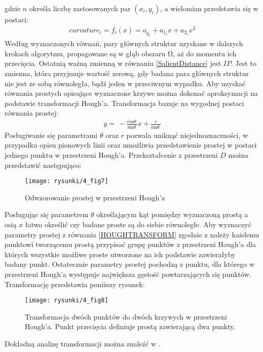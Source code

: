 \documentclass[12pt, twoside, openany]{report}
\theoremstyle{definition}
\begin{document}
gdzie $n$ określa liczbę zastosowanych par $(x_i,y_i)$, a wielomian przedstawia się w postaci:
\begin{align}
curvature_i={f_i\left(x\right)=a}_{0_i}+a_{1_i}x+a_{2_i}x^2
\end{align}
Według wyznaczonych równań, pary głównych struktur uzyskane w dalszych krokach algorytmu, propagowane są w głąb obszaru $\mathrm{\Omega }$, aż do momentu ich przecięcia. Ostatnią ważną zmienną w równaniu \eqref{SalientDistance} jest $IP$. Jest to zmienna, która przyjmuje wartość zerową, gdy badana para głównych struktur nie jest ze sobą równoległa, bądź jeden w przeciwnym wypadku. Aby uzyskać równania prostych opisujące wyznaczone krzywe można dokonać aproksymacji na podstawie transformacji Hough'a. Transformacja bazuje na wygodnej postaci równania prostej:
\begin{align}
y=\ -\frac{{\mathrm{cos} \theta \ }}{{\mathrm{sin} \theta \ }}x+\frac{r}{{\mathrm{sin} \theta \ }}
\label{HOUGHTRANSFORM}
\end{align}
Posługiwanie się parametrami $\theta $ oraz $r$ pozwala uniknąć niejednoznaczności, w przypadku opisu pionowych linii oraz umożliwia przedstawienie prostej w postaci jednego punktu w przestrzeni Hough'a. Przekształcenie z przestrzeni $D$ można przedstawić następująco:
\begin{figure}[!h]
	\centering
	\texttt{[image: rysunki/4\_fig7]}
	\caption{Odwzorowanie prostej w przestrzeni Hough’a}
\label{4_fig7}
\end{figure}
Posługując się parametrem $\theta$ określającym kąt pomiędzy wyznaczoną prostą a osią $x$ łatwo określić czy badane proste są do siebie równoległe. Aby wyznaczyć parametry prostej z równania \eqref{HOUGHTRANSFORM} zgodnie z \cite{houghTransform} należy każdemu punktowi tworzącemu prostą przypisać grupę punktów z przestrzeni Hough'a dla których wszystkie możliwe proste utworzone na ich podstawie zawierałyby badany punkt. Ostatecznie parametry prostej pochodzą z punktu, dla którego w przestrzeni Hough'a występuje największa gęstość powtarzających się punktów. Transformację przedstawia poniższy rysunek:
\begin{figure}[!h]
	\centering
	\texttt{[image: rysunki/4\_fig8]}
	\caption{Transformacja dwóch punktów do dwóch krzywych w przestrzeni Hough'a. Punkt przecięcia definiuje prostą zawierającą dwa punkty.}
\label{4_fig8}
\end{figure}
Dokładną analizę transformacji można znaleźć w \cite{houghTransform}.
\end{document}
